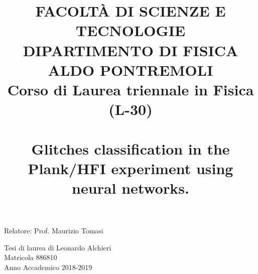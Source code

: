 \documentclass[12pt,a4paper,final]{report}			%
\title{
		\centering
		\vspace{2mm}
		\begin{figure}[h]
			\centering{
			\texttt{[image: ../figures/logo.jpg]} }
		\end{figure}
		 \vspace{5mm}
		 {FACOLTÀ DI SCIENZE E TECNOLOGIE} \\
		 {DIPARTIMENTO DI FISICA ALDO PONTREMOLI} \\
		 {Corso di Laurea triennale in Fisica (L-30)} \\
		 \vspace{5mm}
		\noindent\hrulefill \\
		\vspace{5mm}
		 \textbf{{Glitches classification in the Plank/HFI experiment using neural networks.}} 
	 }
\date{}
\begin{document}
			\maketitle
				\begin{flushleft}
			\vspace{10mm}
			Relatore: Prof. Maurizio Tomasi \\
			\par \end{flushleft}
		\begin{flushright}
			Tesi di laurea di Leonardo Alchieri
			\\Matricola 886810
			\\Anno Accademico 2018-2019
			\par \end{flushright}
		\thispagestyle{empty}
		
	
\end{document}
